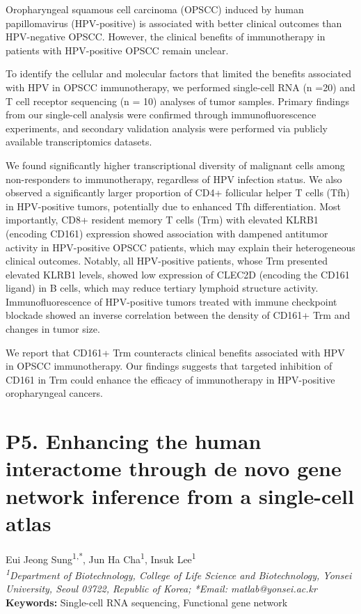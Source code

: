 \noindent
Oropharyngeal squamous cell carcinoma (OPSCC) induced by human papillomavirus (HPV-positive) is associated with better clinical outcomes than HPV-negative OPSCC. However, the clinical benefits of immunotherapy in patients with HPV-positive OPSCC remain unclear.

To identify the cellular and molecular factors that limited the benefits associated with HPV in OPSCC immunotherapy, we performed single-cell RNA (n =20) and T cell receptor sequencing (n = 10) analyses of tumor samples. Primary findings from our single-cell analysis were confirmed through immunofluorescence experiments, and secondary validation analysis were performed via publicly available transcriptomics datasets.

We found significantly higher transcriptional diversity of malignant cells among non-responders to immunotherapy, regardless of HPV infection status. We also observed a significantly larger proportion of CD4+ follicular helper T cells (Tfh) in HPV-positive tumors, potentially due to enhanced Tfh differentiation. Most importantly, CD8+ resident memory T cells (Trm) with elevated KLRB1 (encoding CD161) expression showed association with dampened antitumor activity in HPV-positive OPSCC patients, which may explain their heterogeneous clinical outcomes. Notably, all HPV-positive patients, whose Trm presented elevated KLRB1 levels, showed low expression of CLEC2D (encoding the CD161 ligand) in B cells, which may reduce tertiary lymphoid structure activity. Immunofluorescence of HPV-positive tumors treated with immune checkpoint blockade showed an inverse correlation between the density of CD161+ Trm and changes in tumor size.

We report that CD161+ Trm counteracts clinical benefits associated with HPV in OPSCC immunotherapy. Our findings suggests that targeted inhibition of CD161 in Trm could enhance the efficacy of immunotherapy in HPV-positive oropharyngeal cancers.
\newpage

\section*{P5. Enhancing the human interactome through de novo gene network inference from a single-cell atlas}

\begin{center}
Eui Jeong Sung\textsuperscript{1,*}, Jun Ha Cha\textsuperscript{1}, Insuk Lee\textsuperscript{1} \\
\vspace{0.2cm}
\textit{\textsuperscript{1}Department of Biotechnology, College of Life Science and Biotechnology, Yonsei University, Seoul 03722, Republic of Korea; *Email: matlab@yonsei.ac.kr} \\
\vspace{0.2cm}
\textbf{Keywords:} Single-cell RNA sequencing, Functional gene network
\end{center}


